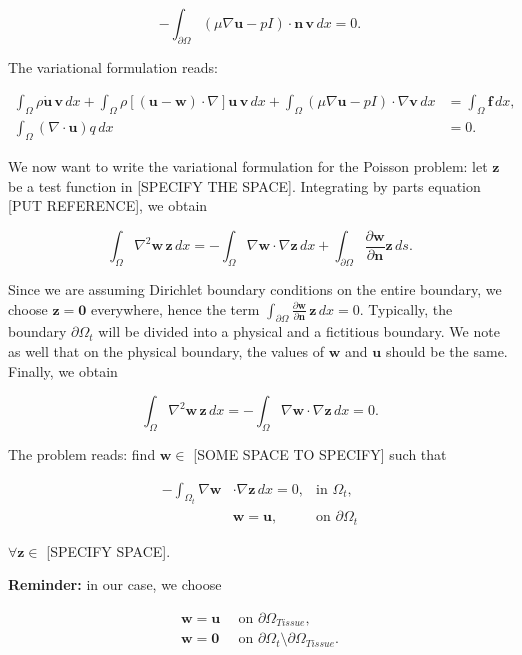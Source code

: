 \documentclass[11pt,a4paper,titlepage]{report}
\begin{document}
\[- \int_{\partial \Omega} (\mu \nabla \mathbf{u} - pI) \cdot \mathbf{n} \, \mathbf{v} \, dx = 0.\]

The variational formulation reads:

\begin{align*}
\int_{\Omega} \rho \dot{\mathbf{u}} \, \mathbf{v} \, dx
+ \int_{\Omega} \rho [(\mathbf{u - w}) \cdot \nabla] \mathbf{u} \, \mathbf{v} \, dx
+ \int_{\Omega} (\mu \nabla \mathbf{u} - pI) \cdot \nabla \mathbf{v} \, dx
&=  \int_{\Omega} \mathbf{f} \, dx,  \\
\int_{\Omega} ( \nabla \cdot \mathbf{u} ) q \, dx &= 0.
\end{align*}

We now want to write the variational formulation for the Poisson problem: let $\mathbf{z}$ be a test function in [SPECIFY THE SPACE]. Integrating by parts equation [PUT REFERENCE], we obtain

\[
\int_{\Omega} \nabla^2 \mathbf{w} \, \mathbf{z} \, dx = - \int_{\Omega} \nabla \mathbf{w} \cdot \nabla \mathbf{z} \, dx + \int_{\partial \Omega} \frac{\partial \mathbf{w}}{\partial \mathbf{n}} \mathbf{z} \, ds.
\]

Since we are assuming Dirichlet boundary conditions on the entire boundary, we choose $\mathbf{z = 0}$ everywhere, hence the term $\int_{\partial \Omega} \frac{\partial \mathbf{w}}{\partial \mathbf{n}} \, \mathbf{z} \, dx  = 0 $. Typically, the boundary $\partial \Omega_t$ will be divided into a physical and a fictitious boundary. We note as well that on the physical boundary, the values of $\mathbf{w}$ and $\mathbf{u}$ should be the same.
Finally, we obtain

\[
\int_{\Omega} \nabla^2 \mathbf{w} \, \mathbf{z} \, dx = - \int_{\Omega} \nabla \mathbf{w} \cdot \nabla \mathbf{z} \, dx = 0.
\]

The problem reads: find $\mathbf{w} \in$ [SOME SPACE TO SPECIFY] such that

\[
\begin{aligned}
-  \int_{\Omega_t} \nabla \mathbf{w} & \cdot \nabla \mathbf{z} \, dx = 0, & \text{in } \Omega_t, \\
& \mathbf{w} = \mathbf{u}, & \text{on } \partial \Omega_t
\end{aligned}
\]

$\forall \mathbf{z} \in $ [SPECIFY SPACE].

\textbf{Reminder:} in our case, we choose

\[
\begin{aligned}
\mathbf{w = u} \, & \text{ on } \partial \Omega_{Tissue}, \\
\mathbf{w = 0} \, & \text{ on } \partial \Omega_t \setminus \partial \Omega_{Tissue}.
\end{aligned}
\]
\end{document}
